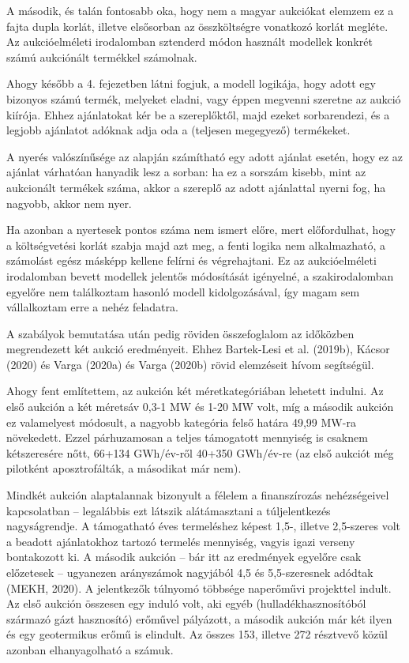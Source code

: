 \documentclass[twoside, magyar, showtrims]{corvinusphd}
\begin{document}
A második, és talán fontosabb oka, hogy nem a magyar aukciókat elemzem
ez a fajta dupla korlát, illetve elsősorban az összköltségre vonatkozó korlát megléte.
Az aukcióelméleti irodalomban sztenderd módon használt
modellek konkrét számú aukciónált termékkel számolnak.

Ahogy később a 4. fejezetben látni fogjuk,
a modell logikája, hogy adott egy bizonyos számú
termék, melyeket eladni, vagy éppen megvenni szeretne az aukció kiírója.
Ehhez ajánlatokat kér be a szereplőktől, majd ezeket sorbarendezi,
és a legjobb ajánlatot adóknak adja oda a (teljesen megegyező) termékeket.

A nyerés valószínűsége az alapján számítható egy adott ajánlat esetén,
hogy ez az ajánlat várhatóan hanyadik lesz a sorban: ha ez a sorszám kisebb,
mint az aukcionált termékek száma, akkor a szereplő az adott ajánlattal nyerni fog,
ha nagyobb, akkor nem nyer. 

Ha azonban a nyertesek pontos száma nem ismert előre, mert előfordulhat, hogy
a költségvetési korlát szabja majd azt meg, a fenti logika nem alkalmazható,
a számolást egész másképp kellene felírni és végrehajtani. 
Ez az aukcióelméleti irodalomban bevett modellek jelentős módosítását igényelné,
a szakirodalomban egyelőre nem találkoztam hasonló modell kidolgozásával,
így magam sem vállalkoztam erre a nehéz feladatra.

A szabályok bemutatása után pedig röviden összefoglalom
az időközben megrendezett két aukció eredményeit.
Ehhez Bartek-Lesi et al. (2019b), Kácsor (2020) és Varga (2020a) és Varga (2020b) 
rövid elemzéseit hívom segítségül.

Ahogy fent említettem, az aukción két méretkategóriában lehetett indulni.
Az első aukción a két méretsáv 0,3-1 MW és 1-20 MW volt,
míg a második aukción ez valamelyest módosult, a nagyobb kategória
felső határa 49,99 MW-ra növekedett. Ezzel párhuzamosan
a teljes támogatott mennyiség is csaknem kétszeresére nőtt, 
66+134 GWh/év-ről 40+350 GWh/év-re
(az első aukciót még pilotként aposztrofálták, a másodikat már nem).

Mindkét aukción alaptalannak bizonyult a félelem a finanszírozás
nehézségeivel kapcsolatban -- legalábbis ezt látszik alátámasztani 
a túljelentkezés nagyságrendje. A támogatható éves termeléshez
képest 1,5-, illetve 2,5-szeres volt a beadott ajánlatokhoz tartozó
termelés mennyiség, vagyis igazi verseny bontakozott ki.
A második aukción -- bár itt az eredmények egyelőre csak előzetesek --
ugyanezen arányszámok nagyjából 4,5 és 5,5-szeresnek adódtak (MEKH, 2020).
A jelentkezők túlnyomó többsége naperőművi projekttel
indult. Az első aukción összesen egy induló volt, aki egyéb
(hulladékhasznosítóból származó gázt hasznosító) erőművel
pályázott, a második aukción már két ilyen és egy geotermikus
erőmű is elindult. Az összes 153, illetve 272 résztvevő közül azonban
elhanyagolható a számuk. 
\end{document}
